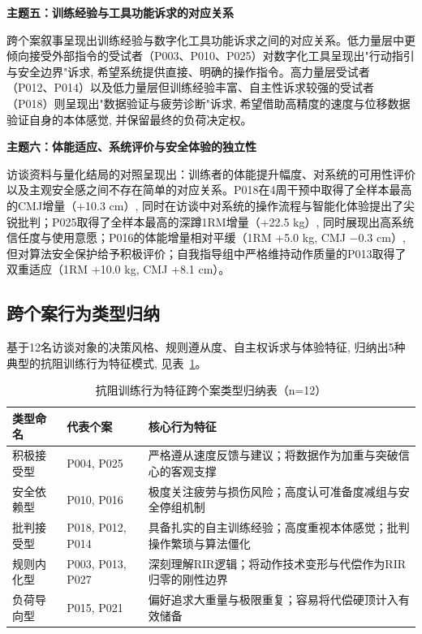 \textbf{主题五：训练经验与工具功能诉求的对应关系}

跨个案叙事呈现出训练经验与数字化工具功能诉求之间的对应关系。低力量层中更倾向接受外部指令的受试者（P003、P010、P025）对数字化工具呈现出"行动指引与安全边界"诉求, 希望系统提供直接、明确的操作指令。高力量层受试者（P012、P014）以及低力量层但训练经验丰富、自主性诉求较强的受试者（P018）则呈现出"数据验证与疲劳诊断"诉求, 希望借助高精度的速度与位移数据验证自身的本体感觉, 并保留最终的负荷决定权。

\textbf{主题六：体能适应、系统评价与安全体验的独立性}

访谈资料与量化结局的对照呈现出：训练者的体能提升幅度、对系统的可用性评价以及主观安全感之间不存在简单的对应关系。P018在4周干预中取得了全样本最高的CMJ增量（+10.3 cm）, 同时在访谈中对系统的操作流程与智能化体验提出了尖锐批判；P025取得了全样本最高的深蹲1RM增量（+22.5 kg）, 同时展现出高系统信任度与使用意愿；P016的体能增量相对平缓（1RM +5.0 kg, CMJ $-$0.3 cm）, 但对算法安全保护给予积极评价；自我指导组中严格维持动作质量的P013取得了双重适应（1RM +10.0 kg, CMJ +8.1 cm）。

\subsection{跨个案行为类型归纳}
\label{sec:behavior_patterns}

基于12名访谈对象的决策风格、规则遵从度、自主权诉求与体验特征, 归纳出5种典型的抗阻训练行为特征模式, 见表~\ref{tab:behavior_patterns}。

\begin{table}[htbp]
\centering
\caption{抗阻训练行为特征跨个案类型归纳表（n=12）}
\label{tab:behavior_patterns}

\small
\begin{tabular}{lp{2cm}p{8cm}}
\toprule
类型命名 & 代表个案 & 核心行为特征 \\
\midrule
积极接受型 & P004, P025 & 严格遵从速度反馈与建议；将数据作为加重与突破信心的客观支撑 \\
安全依赖型 & P010, P016 & 极度关注疲劳与损伤风险；高度认可准备度减组与安全停组机制 \\
批判接受型 & P018, P012, P014 & 具备扎实的自主训练经验；高度重视本体感觉；批判操作繁琐与算法僵化 \\
规则内化型 & P003, P013, P027 & 深刻理解RIR逻辑；将动作技术变形与代偿作为RIR归零的刚性边界 \\
负荷导向型 & P015, P021 & 偏好追求大重量与极限重复；容易将代偿硬顶计入有效储备 \\
\bottomrule
\end{tabular}

\end{table}

